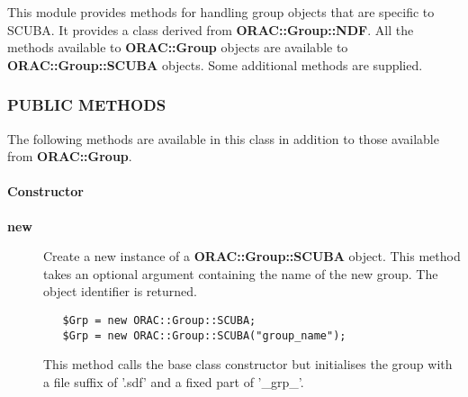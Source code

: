 This module provides methods for handling group objects that
are specific to SCUBA. It provides a class derived from \textbf{ORAC::Group::NDF}.
All the methods available to \textbf{ORAC::Group} objects are available
to \textbf{ORAC::Group::SCUBA} objects. Some additional methods are supplied.

\subsubsection*{PUBLIC METHODS\label{ORAC::Group::SCUBA_PUBLIC_METHODS}}


The following methods are available in this class in addition to
those available from \textbf{ORAC::Group}.

\paragraph*{Constructor\label{ORAC::Group::SCUBA_Constructor}}
\begin{description}

\item[{\textbf{new}}] \mbox{}

Create a new instance of a \textbf{ORAC::Group::SCUBA} object.
This method takes an optional argument containing the
name of the new group. The object identifier is returned.

\begin{verbatim}
   $Grp = new ORAC::Group::SCUBA;
   $Grp = new ORAC::Group::SCUBA("group_name");
\end{verbatim}


This method calls the base class constructor but initialises
the group with a file suffix of '.sdf' and a fixed part
of '\_grp\_'.

\end{description}
